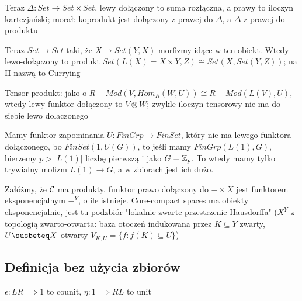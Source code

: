 

Teraz $\Delta:Set\to Set\times Set$, lewy dołączony to suma rozłączna, a prawy to iloczyn kartezjański; morał: koprodukt jest dołączony z prawej do $\Delta$, a $\Delta$ z prawej do produktu

Teraz $Set\to Set$ taki, że $X\mapsto Set(Y, X)$ morfizmy idące w ten obiekt. Wtedy lewo-dołączony to produkt $Set(L(X)=X\times Y, Z)\cong Set(X, Set(Y, Z))$; na II nazwą to Currying


Tensor produkt: jako o $R-Mod(V, Hom_R(W, U))\cong R-Mod(L(V), U)$, wtedy lewy funktor dołączony to $V\otimes W$; zwykle iloczyn tensorowy nie ma do siebie lewo dolaczonego

Mamy funktor zapominania $U:FinGrp\to FinSet$, który nie ma lewego funktora dołączonego, bo $FinSet(1, U(G))$, to jeśli mamy $FinGrp(L(1), G)$, bierzemy $p>|L(1)|$ liczbę pierwszą i jako $G=\mathbb{Z}_p$. To wtedy mamy tylko trywialny mofizm $L(1)\to G$, a w zbiorach jest ich dużo.

Załóżmy, że $\mathcal{C}$ ma produkty. funktor prawo dołączony do $-\times X$ jest funktorem eksponencjalnym $-^Y$, o ile istnieje. Core-compact spaces ma obiekty eksponencjalnie, jest tu podzbiór "lokalnie zwarte przestrzenie Hausdorffa" ($X^Y$ z topologią zwarto-otwarta: baza otoczeń indukowana przez $K\subseteq Y$ zwarty, $U\susbeteq X$ otwarty $V_{K,U}=\{f:f(K)\subseteq U\}$)

\subsection{Definicja bez użycia zbiorów}

\begin{definition}{}{}
$\epsilon:LR\implies 1$ to counit, $\eta:1\implies RL$ to unit
  
  \begin{center}
  \end{center}
  \begin{center}
  \end{center}
\end{definition}

